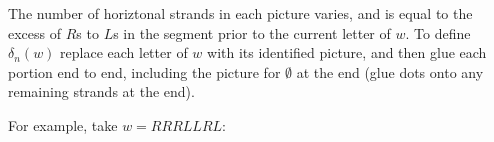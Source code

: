 \documentclass[11pt]{article} %
\begin{document}
\begin{mydef}

The number of horiztonal strands in each picture varies, and is equal to the excess of $R$s to $L$s in the segment prior to the current letter of $w$. To define $\delta_n(w)$ replace each letter of $w$ with its identified picture, and then glue each portion end to end, including the picture for $\emptyset$ at the end (glue dots onto any remaining strands at the end).
\end{mydef}

For example, take $w=RRRLLRL$:
\end{document}
